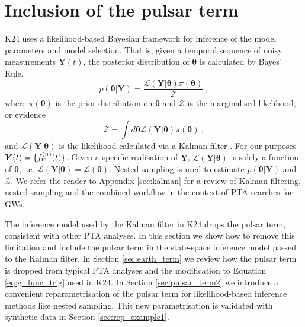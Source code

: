\documentclass[fleqn,usenatbib,useAMS]{mnras}
\begin{document}
\section{Inclusion of the pulsar term}\label{sec:pulsar_term}
K24 uses a likelihood-based Bayesian framework for inference of the model parameters and model selection. That is, given a temporal sequence of noisy measurements $\boldsymbol{Y}(t)$, the posterior distribution of $\boldsymbol{\theta}$ is calculated by Bayes' Rule,
\begin{equation}
	p(\boldsymbol{\theta} | \boldsymbol{Y}) = \frac{\mathcal{L}(\boldsymbol{Y} | \boldsymbol{\theta}) \pi(\boldsymbol{\theta})}{\mathcal{Z}} \ ,
\end{equation}
where $\pi(\boldsymbol{\theta})$ is the prior distribution on $\boldsymbol{\theta}$ and $\mathcal{Z}$ is the marginalised likelihood, or evidence
\begin{equation}
	\mathcal{Z} = \int d \boldsymbol{\theta} \mathcal{L}(\boldsymbol{Y} | \boldsymbol{\theta})  \pi(\boldsymbol{\theta})  \ , \label{eq:model_evidence}
\end{equation}
and $\mathcal{L}(\boldsymbol{Y}| \boldsymbol{\theta})$ is the likelihood calculated via a Kalman filter \citep{Kalman1}. For our purposes ${\boldsymbol{Y}}(t) = \{ f_{\rm m}^{(n)}(t) \}$. Given a specific realisation of $\boldsymbol{Y}$, $\mathcal{L}(\boldsymbol{Y}| \boldsymbol{\theta})$ is solely a function of $\boldsymbol{\theta}$, i.e. $\mathcal{L}(\boldsymbol{Y}| \boldsymbol{\theta}) = \mathcal{L}(\boldsymbol{\theta})$. Nested sampling \citep{Skilling} is used to estimate $p(\boldsymbol{\theta} | \boldsymbol{Y})$ and $\mathcal{Z}$. We refer the reader to Appendix  \ref{sec:kalman} for a review of Kalman filtering, nested sampling and the combined workflow in the context of PTA searches for GWs. \newline 

The inference model used by the Kalman filter in K24 drops the pulsar term, consistent with other PTA analyses. In this section we show how to remove this limitation and include the pulsar term in the state-space inference model passed to the Kalman filter. In Section \ref{sec:earth_term} we review how the pulsar term is dropped from typical PTA analyses and the modification to Equation \eqref{eq:g_func_trig} used in K24. In Section \ref{sec:pulsar_term2} we introduce a convenient reparametrisation of the pulsar term for likelihood-based inference methods like nested sampling. This new parametrisation is validated with synthetic data in Section \ref{sec:rep_example1}.
\end{document}
